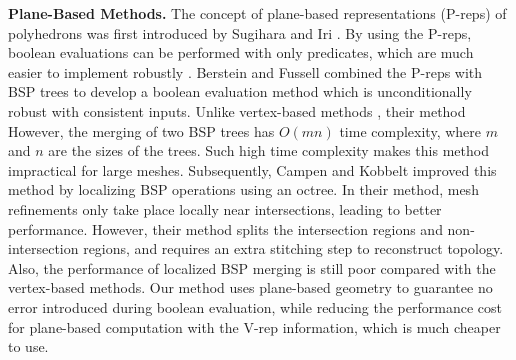 \textbf{Plane-Based Methods.}
\label{sec:pbrelated}
The concept of plane-based representations (P-reps) of polyhedrons was first introduced by Sugihara and Iri \cite{sugihara1990solid}. By using the P-reps, boolean evaluations can be performed with only predicates, which are much easier to implement robustly . Berstein and Fussell \cite{bernstein2009fast} combined the P-reps with BSP trees \cite{thibault1987set,naylor1990merging} to develop a boolean evaluation method which is unconditionally robust with consistent inputs. Unlike vertex-based methods , their method 
However, the merging of two BSP trees has $O(mn)$ time complexity, where $m$ and $n$ are the sizes of the trees. Such high time complexity makes this method impractical for large meshes. Subsequently, Campen and Kobbelt \cite{campen2010exact} improved this method by localizing BSP operations using an octree. In their method, mesh refinements only take place locally near intersections, leading to better performance. However, their method splits the intersection regions and non-intersection regions, and requires an extra stitching step to reconstruct topology. Also, the performance of localized BSP merging is still poor compared with the vertex-based methods. Our method uses plane-based geometry to guarantee no error introduced during boolean evaluation, while reducing the performance cost for plane-based computation with the V-rep information, which is much cheaper to use.
